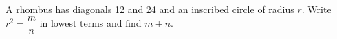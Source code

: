 A rhombus has diagonals 12 and 24 and an inscribed circle of radius $r$. Write $r^2=\dfrac{m}{n}$ in lowest terms and find $m+n$.
